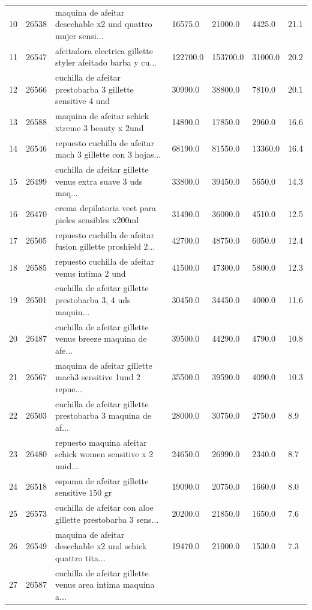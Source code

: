 \documentclass[
  spanish,
  letterpaper,
  DIV=11,
  numbers=noendperiod]{scrartcl}
\begin{document}
{\begin{longtable}[]{@{}lllllll@{}}
10 & 26538 & maquina de afeitar desechable x2 und quattro mujer sensi...
& 16575.0 & 21000.0 & 4425.0 & 21.1 \\
11 & 26547 & afeitadora electrica gillette styler afeitado barba y cu...
& 122700.0 & 153700.0 & 31000.0 & 20.2 \\
12 & 26566 & cuchilla de afeitar prestobarba 3 gillette sensitive 4 und
& 30990.0 & 38800.0 & 7810.0 & 20.1 \\
13 & 26588 & maquina de afeitar schick xtreme 3 beauty x 2und & 14890.0
& 17850.0 & 2960.0 & 16.6 \\
14 & 26546 & repuesto cuchilla de afeitar mach 3 gillette con 3 hojas...
& 68190.0 & 81550.0 & 13360.0 & 16.4 \\
15 & 26499 & cuchilla de afeitar gillette venus extra suave 3 uds maq...
& 33800.0 & 39450.0 & 5650.0 & 14.3 \\
16 & 26470 & crema depilatoria veet para pieles sensibles x200ml &
31490.0 & 36000.0 & 4510.0 & 12.5 \\
17 & 26505 & repuesto cuchilla de afeitar fusion gillette proshield 2...
& 42700.0 & 48750.0 & 6050.0 & 12.4 \\
18 & 26585 & repuesto cuchilla de afeitar venus intima 2 und & 41500.0 &
47300.0 & 5800.0 & 12.3 \\
19 & 26501 & cuchilla de afeitar gillette prestobarba 3, 4 uds maquin...
& 30450.0 & 34450.0 & 4000.0 & 11.6 \\
20 & 26487 & cuchilla de afeitar gillette venus breeze maquina de afe...
& 39500.0 & 44290.0 & 4790.0 & 10.8 \\
21 & 26567 & maquina de afeitar gillette mach3 sensitive 1und 2 repue...
& 35500.0 & 39590.0 & 4090.0 & 10.3 \\
22 & 26503 & cuchilla de afeitar gillette prestobarba 3 maquina de af...
& 28000.0 & 30750.0 & 2750.0 & 8.9 \\
23 & 26480 & repuesto maquina afeitar schick women sensitive x 2 unid...
& 24650.0 & 26990.0 & 2340.0 & 8.7 \\
24 & 26518 & espuma de afeitar gillette sensitive 150 gr & 19090.0 &
20750.0 & 1660.0 & 8.0 \\
25 & 26573 & cuchilla de afeitar con aloe gillette prestobarba 3 sens...
& 20200.0 & 21850.0 & 1650.0 & 7.6 \\
26 & 26549 & maquina de afeitar desechable x2 und schick quattro tita...
& 19470.0 & 21000.0 & 1530.0 & 7.3 \\
27 & 26587 & cuchilla de afeitar gillette venus area intima maquina a...

\end{longtable}}
\end{document}
